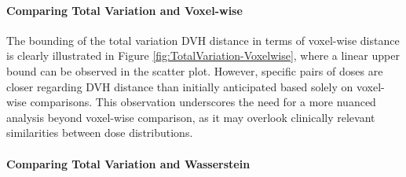 \paragraph{Comparing Total Variation and Voxel-wise}
The bounding of the total variation DVH distance in terms of voxel-wise distance is clearly illustrated in Figure \ref{fig:TotalVariation-Voxelwise}, where a linear upper bound can be observed in the scatter plot.
However, specific pairs of doses are closer regarding DVH distance than initially anticipated based solely on voxel-wise comparisons.
This observation underscores the need for a more nuanced analysis beyond voxel-wise comparison, as it may overlook clinically relevant similarities between dose distributions.

\paragraph{Comparing Total Variation and Wasserstein}



